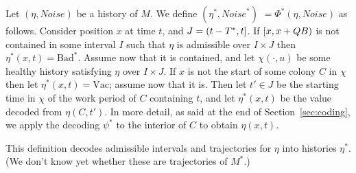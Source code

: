 \documentclass[11pt]{memoir}
\theoremstyle{definition} %
\renewcommand{\ge}{\geq}
\def\B{B}
\newcommand{\Noise}{\mathit{Noise}}
\newcommand{\Q}{Q} %
\newcommand{\Tu}{T}
\newcommand{\Tus}{T^{*}}
\newcommand{\Bad}{\mathrm{Bad}}
\newcommand{\Vacant}{\mathrm{Vac}}
\begin{document}
\begin{definition}[Scale-up]\label{def:scale-up}
Let \( (\eta,\Noise) \) be a history of \( M \).
We define \( (\eta^{*},\Noise^{*}) \) \( =\Phi^{*}(\eta,\Noise) \) as follows.
Consider position \( x \) at time \( t \), and \( J=\rint{t-\Tus}{t} \).
If \( \lint{x}{x+\Q\B} \) is not contained in some interval \( I \) such that \( \eta \) is admissible
over \( I\times J \) then \( \eta^{*}(x,t)=\Bad^{*} \).
Assume now that it is contained, and let
\( \chi(\cdot,u) \) be some healthy history satisfying \( \eta \) over \( I\times J \).
If \( x \) is not the start of some colony \( C \) in \( \chi \)
then let \( \eta^{*}(x,t)=\Vacant \); assume now that it is.
Then let \( t'\in J \) be the starting time in \( \chi \) of the work period of \( C \)
containing \( t \), and let \( \eta^{*}(x,t) \) be the value decoded from \( \eta(C,t') \).
In more detail, as said at the end of Section~\ref{sec:coding}, we apply the decoding
\( \psi^{*} \) to the interior of \( C \) to obtain \( \eta(x,t) \).
\end{definition}

This definition decodes admissible intervals and trajectories for \( \eta \) into 
histories \( \eta^{*} \).
(We don't know yet whether these are trajectories of \( M^{*} \).)




\end{document}
